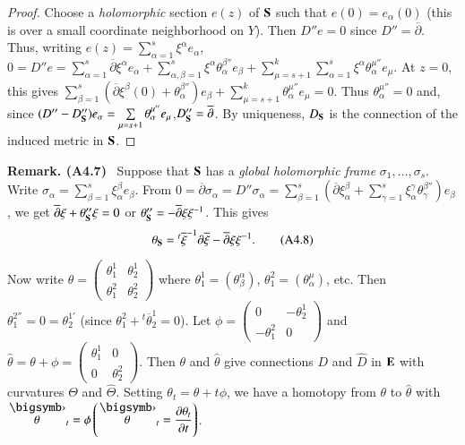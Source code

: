 \begin{proof}
Choose a {\em holomorphic} section $e(z)$ of $\mathbf{S}$ such that $e(0)=e_{\alpha}(0)$ (this is over a small coordinate neighborhood on $Y$). Then $D''e=0$ since $D''=\overline{\partial}$. Thus, writing $e(z)=\sum\limits^{s}_{\alpha=1}\xi^{\alpha}e_{\alpha}$, $0=D''e=\sum\limits^{s}_{\alpha=1}\overline{\partial}\xi^{\alpha}e_{\alpha}+\sum\limits^{s}_{\alpha,\beta=1}\xi^{\alpha}\theta^{\beta''}_{\alpha}e_{\beta}+\sum\limits^{k}_{\mu=s+1}\sum\limits^{s}_{\alpha=1}\xi^{\alpha}\theta^{\mu''}_{\alpha}e_{\mu}$. At $z=0$, this gives $\sum\limits^{s}_{\beta=1}(\overline{\partial}\xi^{\beta}(0)+\theta^{\beta''}_{\alpha})e_{\beta}+\sum\limits^{k}_{\mu=s+1}\theta^{\mu''}_{\alpha}e_{\mu}=0$. Thus $\theta^{\mu''}_{\alpha}=0$ and, since $(D''-D''_{\mathbf{S}})e_{\alpha}=\sum\limits_{\mu=s+1}\theta^{\mu''}_{\alpha}e_{\mu}$,\pageoriginale $D''_{\mathbf{S}}=\overline{\partial}$. By uniqueness, $D_{\mathbf{S}}$ is the connection of the induced metric in $\mathbf{S}$.
\end{proof}

\medskip
\noindent
{\bf Remark. (A4.7)}~ Suppose that $\mathbf{S}$ has a {\em global holomorphic frame} $\sigma_{1},\ldots,\sigma_{s}$. Write $\sigma_{\alpha}=\sum\limits^{s}_{\beta=1}\xi^{\beta}_{\alpha}e_{\beta}$. From $0=\overline{\partial}\sigma_{\alpha}=D''\sigma_{\alpha}=\sum\limits^{s}_{\beta=1}(\overline{\partial}\xi^{\beta}_{\alpha}+\sum\limits^{s}_{\gamma=1}\xi^{\gamma}_{\alpha}\theta^{\beta''}_{\gamma})e_{\beta}$, we get $\overline{\partial}\xi+\theta''_{\mathbf{S}}\xi=0$ or $\theta''_{\mathbf{S}}=-\overline{\partial}\xi\xi^{-1}$. This gives
\begin{equation*}
\theta_{\mathbf{S}}={}^{t}\overline{\xi}^{-1}\partial \overline{\xi}-\overline{\partial}\xi\xi^{-1}.\tag{A4.8}\label{art08-sec4-eqA4.8}
\end{equation*}

Now write $\theta=\left(\begin{smallmatrix} \theta^{1}_{1} & \theta^{1}_{2}\\ \theta^{2}_{1} & \theta^{2}_{2}\end{smallmatrix}\right)$ where $\theta^{1}_{1}=(\theta^{\alpha}_{\beta})$, $\theta^{2}_{1}=(\theta^{\mu}_{\alpha})$, etc. Then $\theta^{2''}_{1}=0=\theta^{1'}_{2}$ (since $\theta^{2}_{1}+{}^{t}\overline{\theta}^{1}_{2}=0$). Let $\phi=\left(\begin{smallmatrix} 0 & - \theta^{1}_{2}\\ -\theta^{2}_{1} & 0\end{smallmatrix}\right)$ and $\widehat{\theta}=\theta+\phi=\left(\begin{smallmatrix} \theta^{1}_{1} & 0\\ 0 & \theta^{2}_{2}\end{smallmatrix}\right)$. Then $\theta$ and $\widehat{\theta}$ give connections $D$ and $\widehat{D}$ in $\mathbf{E}$ with curvatures $\Theta$ and $\widehat{\Theta}$. Setting $\theta_{t}=\theta+t\phi$, we have a homotopy from $\theta$ to $\widehat{\theta}$ with $\overdot{\theta}_{t}=\phi\left(\overdot{\theta}_{t}=\dfrac{\partial \theta_{t}}{\partial t}\right)$.

